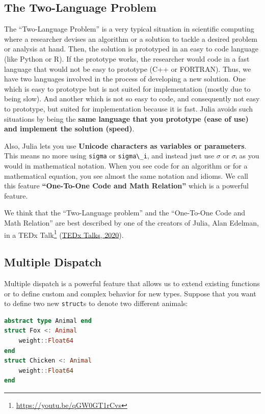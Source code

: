 \documentclass[
  notoc %
]{tufte-book}
\DeclareRobustCommand{\href}[2]{#2\footnote{\url{#1}}}
\newcommand{\passthrough}[1]{#1}
\begin{document}
\hypertarget{sec:two_language}{%
\subsection{The Two-Language Problem}\label{sec:two_language}}

The ``Two-Language Problem'' is a very typical situation in scientific
computing where a researcher devises an algorithm or a solution to
tackle a desired problem or analysis at hand. Then, the solution is
prototyped in an easy to code language (like Python or R). If the
prototype works, the researcher would code in a fast language that would
not be easy to prototype (C++ or FORTRAN). Thus, we have two languages
involved in the process of developing a new solution. One which is easy
to prototype but is not suited for implementation (mostly due to being
slow). And another which is not so easy to code, and consequently not
easy to prototype, but suited for implementation because it is fast.
Julia avoids such situations by being the \textbf{same language that you
prototype (ease of use) and implement the solution (speed)}.

Also, Julia lets you use \textbf{Unicode characters as variables or
parameters}. This means no more using \passthrough{\lstinline!sigma!} or
\passthrough{\lstinline!sigma\_i!}, and instead just use \(σ\) or \(σᵢ\)
as you would in mathematical notation. When you see code for an
algorithm or for a mathematical equation, you see almost the same
notation and idioms. We call this feature \textbf{``One-To-One Code and
Math Relation''} which is a powerful feature.

We think that the ``Two-Language problem'' and the ``One-To-One Code and
Math Relation'' are best described by one of the creators of Julia, Alan
Edelman, in a \href{https://youtu.be/qGW0GT1rCvs}{TEDx Talk}
(\protect\hyperlink{ref-tedxtalksProgrammingLanguageHeal2020}{TEDx
Talks, 2020}).

\hypertarget{sec:multiple_dispatch}{%
\subsection{Multiple Dispatch}\label{sec:multiple_dispatch}}

Multiple dispatch is a powerful feature that allows us to extend
existing functions or to define custom and complex behavior for new
types. Suppose that you want to define two new
\passthrough{\lstinline!struct!}s to denote two different animals:

\begin{lstlisting}[language=Julia]
abstract type Animal end
struct Fox <: Animal
    weight::Float64
end
struct Chicken <: Animal
    weight::Float64
end
\end{lstlisting}
\end{document}
